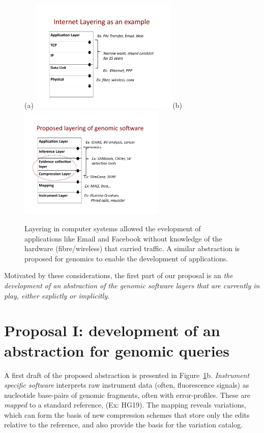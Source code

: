 \documentclass[10pt]{article}
\begin{document}
\begin{figure}[h]
  \centering
(a)  \includegraphics[width=2.75in]{fig/TCPlayer.pdf}
(b)  \includegraphics[width=2.75in]{fig/genomiclayer.pdf}
\caption{Layering in computer systems allowed the evelopment of
  applications like Email and Facebook without knowledge of the
  hardware (fibre/wireless) that carried traffic. A similar
  abstraction is proposed for genomics to enable the development of
  applications.}
  \label{fig:layer}
\end{figure}

Motivated by these considerations, the first part of our proposal is
an \emph{ the development of an abstraction of the genomic software
  layers that are currently in play, either explictly or implicitly}.

\section{Proposal  I: development of an abstraction for genomic queries}
A first draft of the proposed abstraction is presented in
Figure~\ref{fig:layer}b. \emph{Instrument specific software}
interprets raw instrument data (often, fluorescence signals) as
nucleotide base-pairs of genomic fragments, often with
error-profiles. These are \emph{mapped} to a standard reference, (Ex:
HG19). The mapping reveals variations, which can form the basis of new
compression schemes that store only the edits relative to the
reference, and also provide the basis for the variation catalog.
\end{document}
